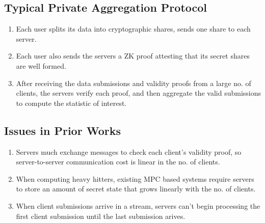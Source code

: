 \subsection{Typical Private Aggregation Protocol}
\begin{enumerate}
    \item Each user splits its data into cryptographic shares, sends one share to each server.
    \item Each user also sends the servers a ZK proof attesting that its secret shares are well formed.
    \item After receiving the data submissions and validity proofs from a large no. of clients, the servers verify each proof, and then aggregate the valid submissions to compute the statistic of interest.
\end{enumerate}

\subsection{Issues in Prior Works}
\begin{enumerate}
    \item Servers much exchange messages to check each client's validity proof, so server-to-server communication cost is linear in the no. of clients.
    \item When computing heavy hitters, existing MPC based systems require servers to store an amount of secret state that grows linearly with the no. of clients.
    \item When client submissions arrive in a stream, servers can't begin processing the first client submission until the last submission arives.
\end{enumerate}

